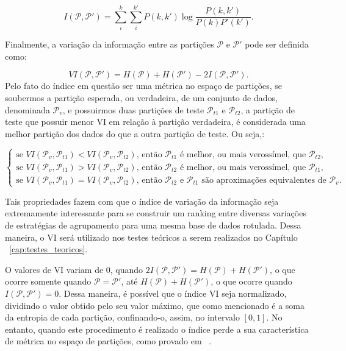 \begin{equation}
I(\mathcal{P},\mathcal{P'}) = \sum_{i}^{k} \sum_{i}^{k'} P(k,k') \log \frac{P(k,k')}{P(k)P'(k')}.
\end{equation}

Finalmente, a variação da informação entre as partições $\mathcal{P}$ e $\mathcal{P'}$ pode ser definida como:

\begin{equation}
VI(\mathcal{P},\mathcal{P'}) = H(\mathcal{P}) + H(\mathcal{P'}) - 2I(\mathcal{P},\mathcal{P'}).
\end{equation}
Pelo fato do índice em questão ser uma métrica no espaço de partições, se soubermos a partição esperada, ou verdadeira, de um conjunto de dados, denominada $\mathcal{P}_v$, e possuirmos duas partições de teste $\mathcal{P}_{t1}$ e $\mathcal{P}_{t2}$, a partição de teste que possuir menor VI em relação à partição verdadeira, é considerada uma melhor partição dos dados do que a outra partição de teste. Ou seja,:

\begin{equation}
\begin{cases}
\text{se } VI(\mathcal{P}_v,\mathcal{P}_{t1})  < VI(\mathcal{P}_v,\mathcal{P}_{t2})\text{, então $\mathcal{P}_{t1}$ é melhor, ou mais verossímel, que $\mathcal{P}_{t2}$} ,\\
\text{se } VI(\mathcal{P}_v,\mathcal{P}_{t1})  > VI(\mathcal{P}_v,\mathcal{P}_{t2})\text{, então $\mathcal{P}_{t2}$ é melhor, ou mais verossímel, que $\mathcal{P}_{t1}$},\\
\text{se } VI(\mathcal{P}_v,\mathcal{P}_{t1})  = VI(\mathcal{P}_v,\mathcal{P}_{t2})\text{, então $\mathcal{P}_{t2}$ e $\mathcal{P}_{t1}$ são aproximações equivalentes de $\mathcal{P}_v$}.
\end{cases}
\end{equation}

Tais propriedades fazem com que o índice de variação da informação seja extremamente interessante para se construir um ranking entre diversas variações de estratégias de agrupamento para uma mesma base de dados rotulada. Dessa maneira, o VI será utilizado nos testes teóricos a serem realizados no Capítulo ~\ref{cap:testes_teoricos}.

O valores de VI variam de 0, quando $2I(\mathcal{P},\mathcal{P'})=H(\mathcal{P}) + H(\mathcal{P'})$, o que ocorre somente quando $\mathcal{P}=\mathcal{P'}$, até $H(\mathcal{P}) + H(\mathcal{P'})$, o que ocorre quando $I(\mathcal{P},\mathcal{P'}) =0$. Dessa maneira, é possível que o índice VI seja normalizado, dividindo o valor obtido pelo seu valor máximo, que como mencionado é a soma da entropia de cada partição, confinando-o, assim, no intervalo $[0,1]$. No entanto, quando este procedimento é realizado o índice perde a sua característica de métrica no espaço de partições, como provado em ~\parencite{Meila}.

